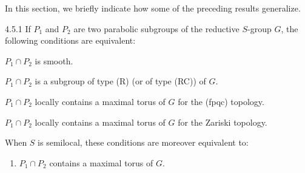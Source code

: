 In this section, we briefly indicate how some of the preceding results generalize.
\begin{proposition}{4.5.1}\label{XXVI.4.5.1}
If $P_1$ and $P_2$ are two parabolic subgroups of the reductive $S$-group $G$, the following conditions are equivalent:
\begin{enumeratei}
\item $P_1\cap P_2$ is smooth.
\item $P_1\cap P_2$ is a subgroup of type (R) (or of type (RC)) of $G$.
\item $P_1\cap P_2$ locally contains a maximal torus of $G$ for the (fpqc) topology.
\item $P_1\cap P_2$ locally contains a maximal torus of $G$ for the Zariski topology.
\end{enumeratei}
When $S$ is semilocal, these conditions are moreover equivalent to:
\begin{enumerate}[label=\textup{(\roman*)},start=5]
\item $P_1\cap P_2$ contains a maximal torus of $G$.
\end{enumerate}
\end{proposition}
